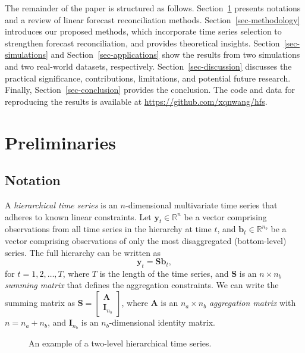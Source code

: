 \documentclass[
  11pt]{article}
\theoremstyle{plain}
\theoremstyle{remark}
\begin{document}
The remainder of the paper is structured as follows.
Section~\ref{sec-preliminaries} presents notations and a review of
linear forecast reconciliation methods. Section~\ref{sec-methodology}
introduces our proposed methods, which incorporate time series selection
to strengthen forecast reconciliation, and provides theoretical
insights. Section~\ref{sec-simulations} and
Section~\ref{sec-applications} show the results from two simulations and
two real-world datasets, respectively. Section~\ref{sec-discussion}
discusses the practical significance, contributions, limitations, and
potential future research. Finally, Section~\ref{sec-conclusion}
provides the conclusion. The code and data for reproducing the results
is available at \url{https://github.com/xqnwang/hfs}.

\section{Preliminaries}\label{sec-preliminaries}

\subsection{Notation}\label{notation}

A \emph{hierarchical time series} is an \(n\)-dimensional multivariate
time series that adheres to known linear constraints. Let
\(\bm{y}_t \in \mathbb{R}^n\) be a vector comprising observations from
all time series in the hierarchy at time \(t\), and
\(\bm{b}_t \in \mathbb{R}^{n_b}\) be a vector comprising observations of
only the most disaggregated (bottom-level) series. The full hierarchy
can be written as \[
\bm{y}_t = \bm{S}\bm{b}_t,
\] for \(t=1,2,\ldots,T\), where \(T\) is the length of the time series,
and \(\bm{S}\) is an \(n \times n_b\) \emph{summing matrix} that defines
the aggregation constraints. We can write the summing matrix as
\(\bm{S} = \left[\begin{array}{c}\bm{A} \\ \bm{I}_{n_b}\end{array}\right]\),
where \(\bm{A}\) is an \(n_a \times n_b\) \emph{aggregation matrix} with
\(n = n_a + n_b\), and \(\bm{I}_{n_b}\) is an \(n_b\)-dimensional
identity matrix.

\begin{figure}


\caption{\label{fig-hts}An example of a two-level hierarchical time
series.}

\end{figure}%
\end{document}
